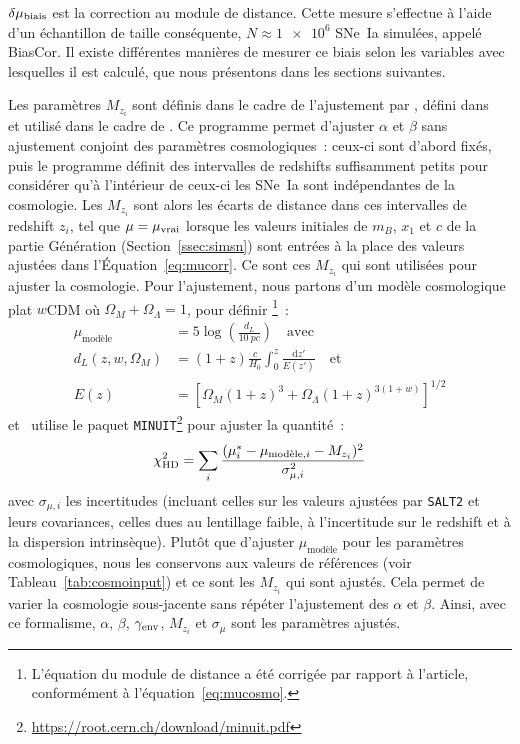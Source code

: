 \documentclass[../main/main.tex]{subfiles}
\begin{document}
$\delta\mu_{\rm biais}$ est la correction au module de distance. Cette mesure
s'effectue à l'aide d'un échantillon de taille conséquente, $N \approx
\num{1e6}$ SNe~Ia simulées, appelé BiasCor. Il existe différentes manières de
mesurer ce biais selon les variables avec lesquelles il est calculé, que nous
présentons dans les sections suivantes.

Les paramètres $M_{z_i}$ sont définis dans le cadre de l'ajustement par \saltmu,
défini dans~\cite{marriner2011} et utilisé dans le cadre de \bbc. Ce programme
permet d'ajuster $\alpha$ et $\beta$ sans ajustement conjoint des paramètres
cosmologiques~: ceux-ci sont d'abord fixés, puis le programme définit des
intervalles de redshifts suffisamment petits pour considérer qu'à l'intérieur de
ceux-ci les SNe~Ia sont indépendantes de la cosmologie. Les $M_{z_i}$ sont alors
les écarts de distance dans ces intervalles de redshift $z_i$, tel que $\mu =
\mu_{\rm vrai}$ lorsque les valeurs initiales de $m_B$, $x_1$ et $c$ de la
partie Génération (Section~\ref{ssec:simsn}) sont entrées à la place des valeurs
ajustées dans l'Équation~\ref{eq:mucorr}. Ce sont ces $M_{z_i}$ qui sont
utilisées pour ajuster la cosmologie. Pour l'ajustement, nous partons d'un
modèle cosmologique plat $w$CDM où $\Omega_M + \Omega_{\Lambda} = 1$, pour
définir \citep{kessler2017}\footnote{L'équation du module de distance a été
corrigée par rapport à l'article, conformément à l'équation~\ref{eq:mucosmo}.}~:
\begin{align}\label{eq:mumodel}
    \mu_{\text{modèle}} & = 5\log\left(\frac{d_L}{\SI{10}{pc}}\right)
                             \quad\text{avec}\\
    d_L(z,w,\Omega_M)   & = (1+z)
                            \frac{c}{H_0}
                            \int_{0}^{z} \frac{\mathrm{d} z'}{E(z')}
                            \quad\text{et}\\
    E(z)                & = \left[ \Omega_M(1+z)^3
                                 + \Omega_{\Lambda}(1+z)^{3(1+w)}
                             \right]^{1/2}
\end{align}
et \saltmu\ utilise le paquet
\texttt{MINUIT}\footnote{\href{https://root.cern.ch/download/minuit.pdf}
{https://root.cern.ch/download/minuit.pdf}}
\citep{james1975} pour ajuster la quantité~:
\begin{equation}
    \chi^2_{\rm HD} = \sum_i \frac{
                          (\mu_i^* - \mu_{\text{modèle},i} - M_{z_i})^2}{
                      \sigma_{\mu,i}^2}
\end{equation}
avec $\sigma_{\mu,i}$ les incertitudes (incluant celles sur les valeurs ajustées
par \texttt{SALT2} et leurs covariances, celles dues au lentillage faible, à
l'incertitude sur le redshift et à la dispersion intrinsèque). Plutôt que
d'ajuster $\mu_{\text{modèle}}$ pour les paramètres cosmologiques, nous les
conservons aux valeurs de références (voir Tableau~\ref{tab:cosmoinput}) et ce
sont les $M_{z_i}$ qui sont ajustés. Cela permet de varier la cosmologie
sous-jacente sans répéter l'ajustement des $\alpha$ et $\beta$. Ainsi, avec ce
formalisme, $\alpha$, $\beta$, $\gamma_{\rm env}$, $M_{z_i}$ et $\sigma_{\mu}$
sont les paramètres ajustés.
\end{document}
